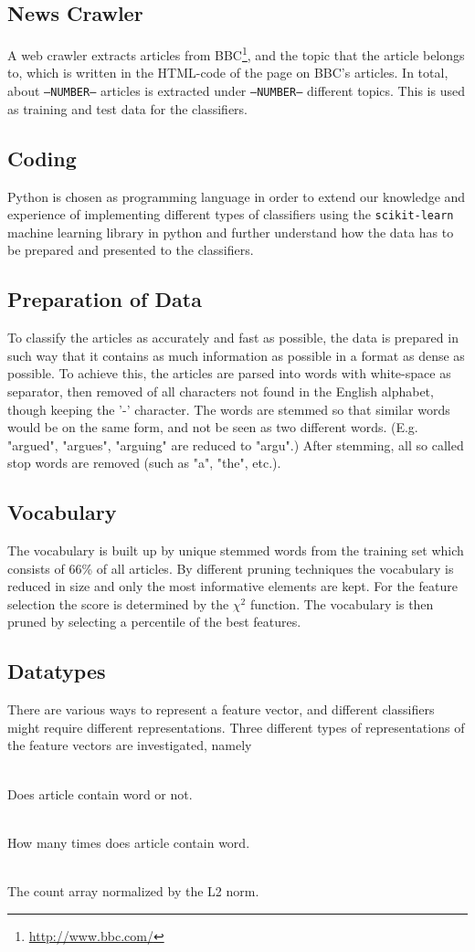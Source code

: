\subsection{News Crawler}
A web crawler extracts articles from BBC\footnote{\url{http://www.bbc.com/}}, and the topic that the article belongs to, which is written in the HTML-code of the page on BBC's articles. In total, about \texttt{--NUMBER--} articles is extracted under \texttt{--NUMBER--} different topics. This is used as training and test data for the classifiers.
\subsection{Coding}
Python is chosen as programming language in order to extend our knowledge and experience of implementing different types of classifiers using the \texttt{scikit-learn} machine learning library in python and further understand how the data has to be prepared and presented to the classifiers.
\subsection{Preparation of Data}
To classify the articles as accurately and fast as possible, the data is prepared in such way that it contains as much information as possible in a format as dense as possible. To achieve this, the articles are parsed into words with white-space as separator, then removed of all characters not found in the English alphabet, though keeping the '-' character. The words are stemmed so that similar words would be on the same form, and not be seen as two different words. (E.g. "argued", "argues", "arguing" are reduced to "argu".) After stemming, all so called stop words are removed (such as "a", "the", etc.). 
\subsection{Vocabulary}
The vocabulary is built up by unique stemmed words from the training set which consists of 66\% of all articles. By different pruning techniques the vocabulary is reduced in size and only the most informative elements are kept. For the feature selection the score is determined by the $\chi^2$ function. The vocabulary is then pruned by selecting a percentile of the best features.
\subsection{Datatypes}
There are various ways to represent a feature vector, and different classifiers might require different representations. Three different types of representations of the feature vectors are investigated, namely
\begin{description}
\item[Binary:]\ \\Does article contain word or not.
\item[Count:]\ \\How many times does article contain word.
\item[Normalized Count by L2 norm:]\ \\ The count array normalized by the L2 norm.
\end{description}

